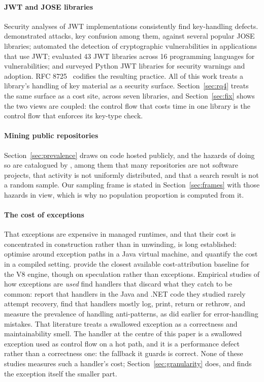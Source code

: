 \documentclass[preprint,12pt,authoryear]{elsarticle}
\begin{document}
\paragraph{JWT and JOSE libraries} Security analyses of JWT implementations
consistently find key-handling defects. \citet{detering2017jose} demonstrated attacks, key confusion among them,
against several popular JOSE libraries; \citet{xu2023jwtkey}
automated the detection of cryptographic vulnerabilities in applications that
use JWT; \citet{yang2026tokentimebomb} evaluated 43 JWT libraries
across 16 programming languages for vulnerabilities; and \citet{shatnawi2024python} surveyed Python JWT libraries for security
warnings and adoption. RFC 8725~\citep{rfc8725} codifies the resulting practice.
All of this work treats a library's handling of key material as a security
surface. Section~\ref{sec:rq4} treats the same surface as a cost site, across
seven libraries, and Section~\ref{sec:fix} shows the two views are coupled: the
control flow that costs time in one library is the control flow that enforces
its key-type check.

\paragraph{Mining public repositories} Section~\ref{sec:prevalence} draws on
code hosted publicly, and the hazards of doing so are catalogued by
\citet{kalliamvakou2014promises}, among them that many
repositories are not software projects, that activity is not uniformly
distributed, and that a search result is not a random sample. Our sampling
frame is stated in Section~\ref{sec:frames} with those hazards in view, which
is why no population proportion is computed from it.

\paragraph{The cost of exceptions} That exceptions are expensive in managed
runtimes, and that their cost is concentrated in construction rather than in
unwinding, is long established: \citet{ogasawara2006edo}
optimise around exception paths in a Java virtual machine, and \citet{renwick2019lowcost} quantify the cost in a compiled setting.
\citet{parravicini2021cost} provide the closest
available cost-attribution baseline for the V8 engine, though on speculation
rather than exceptions. Empirical studies of how exceptions are \emph{used}
find handlers that discard what they catch to be common: \citet{cabral2007exception} report that handlers in the Java and .NET
code they studied rarely attempt recovery, \citet{kery2016examining} find that handlers mostly log, print, return or
rethrow, and \citet{depadua2017prevalence} measure the
prevalence of handling anti-patterns, as \citet{weimer2004finding} did earlier for error-handling mistakes. That
literature treats a swallowed exception as a correctness and maintainability
smell. The handler at the centre of this paper is a swallowed exception used as
control flow on a hot path, and it is a performance defect rather than a
correctness one: the fallback it guards is correct. None of these studies
measures such a handler's cost; Section~\ref{sec:granularity} does, and finds
the exception itself the smaller part.
\end{document}
